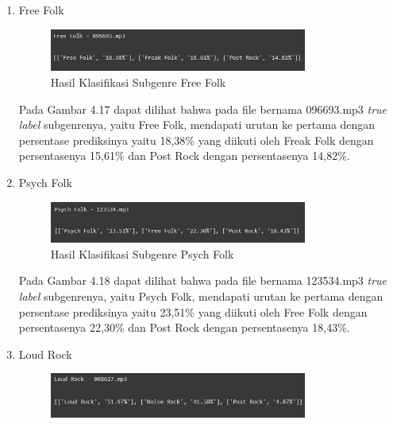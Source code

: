 \begin{enumerate}
	\item Free Folk
	
	\begin{figure}[H]
		\centering
		
		\includegraphics[width=0.8\textwidth]{gambar/classification_free folk}
		
		\caption{Hasil Klasifikasi Subgenre Free Folk}
		\label{fig:klas_freefolk}
	\end{figure}
	
	Pada Gambar 4.17 dapat dilihat bahwa pada file bernama 096693.mp3 \emph{true label} subgenrenya, yaitu Free Folk, mendapati urutan ke pertama dengan persentase prediksinya yaitu 18,38\% yang diikuti oleh Freak Folk dengan persentasenya 15,61\% dan Post Rock dengan persentasenya 14,82\%.
	
	\item Psych Folk
	
	\begin{figure}[H]
		\centering
		
		\includegraphics[width=0.8\textwidth]{gambar/classification_psych folk}
		
		\caption{Hasil Klasifikasi Subgenre Psych Folk}
		\label{fig:klas_psychfolk}
	\end{figure}
	
	Pada Gambar 4.18 dapat dilihat bahwa pada file bernama 123534.mp3 \emph{true label} subgenrenya, yaitu Psych Folk, mendapati urutan ke pertama dengan persentase prediksinya yaitu 23,51\% yang diikuti oleh Free Folk dengan persentasenya 22,30\% dan Post Rock dengan persentasenya 18,43\%.
	
	\item Loud Rock
	
	\begin{figure}[H]
		\centering
		
		\includegraphics[width=0.8\textwidth]{gambar/classification_loud rock}
		

\end{figure}
\end{enumerate}
